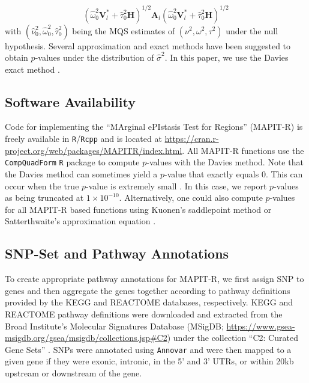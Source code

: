 \documentclass[10pt]{article}
\newcommand{\bV}{\mathbf{V}}
\newcommand{\bA}{\mathbf{A}}
\newcommand{\bH}{\mathbf{H}}
\newcommand{\wh}{\widehat}
\begin{document}
\begin{equation*}
\left(\wh\omega^2_{0}\bV^*_l+\wh\tau^2_{0}\bH\right)^{1/2}\bA_{l}\left(\wh\omega^2_{0}\bV^*_l+\wh\tau^2_{0}\bH\right)^{1/2} 
\end{equation*}
with $(\wh\nu^2_{0},\wh\omega^2_{0},\wh\tau^2_{0})$ being the MQS estimates of $(\nu^2,\omega^2,\tau^2)$ under the null hypothesis. Several approximation and exact methods have been suggested to obtain $p$-values under the distribution of $\wh\sigma^2$. In this paper, we use the Davies exact method \cite{Davies1980,Wu2011}. 

\subsection*{Software Availability}

Code for implementing the ``MArginal ePIstasis Test for Regions'' (MAPIT-R) is freely available in \texttt{R}/\texttt{Rcpp} and is located at \url{https://cran.r-project.org/web/packages/MAPITR/index.html}. All MAPIT-R functions use the \texttt{CompQuadForm} \texttt{R} package to compute $p$-values with the Davies method. Note that the Davies method can sometimes yield a $p$-value that exactly equals 0. This can occur when the true $p$-value is extremely small \cite{Chen2013}. In this case, we report $p$-values as being truncated at $1\times10^{-10}$. Alternatively, one could also compute $p$-values for all MAPIT-R based functions using Kuonen's saddlepoint method \cite{Chen2013,Kuonen1999} or Satterthwaite's approximation equation \cite{Satterthwaite1946}.

\subsection*{SNP-Set and Pathway Annotations}

To create appropriate pathway annotations for MAPIT-R, we first assign SNP to genes and then aggregate the genes together according to pathway definitions provided by the KEGG and REACTOME databases, respectively. KEGG and REACTOME pathway definitions were downloaded and extracted from the Broad Institute's Molecular Signatures Database (MSigDB; \url{https://www.gsea-msigdb.org/gsea/msigdb/collections.jsp#C2}) under the collection ``C2: Curated Gene Sets'' \cite{Liberzon2011}. SNPs were annotated using \texttt{Annovar} \cite{Wang2010a} and were then mapped to a given gene if they were exonic, intronic, in the 5' and 3' UTRs, or within 20kb upstream or downstream of the gene.
\end{document}
